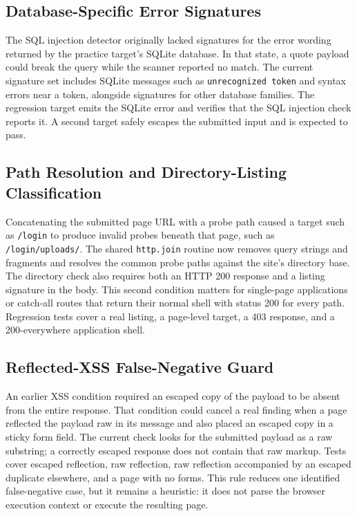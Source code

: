 \documentclass[conference]{IEEEtran}
\begin{document}
\subsection{Database-Specific Error Signatures}
The SQL injection detector originally lacked signatures for the error wording
returned by the practice target's SQLite database. In that state, a quote
payload could break the query while the scanner reported no match. The current
signature set includes SQLite messages such as \texttt{unrecognized token} and
syntax errors near a token, alongside signatures for other database families.
The regression target emits the SQLite error and verifies that the SQL
injection check reports it. A second target safely escapes the submitted input
and is expected to pass.

\subsection{Path Resolution and Directory-Listing Classification}
Concatenating the submitted page URL with a probe path caused a target such as
\texttt{/login} to produce invalid probes beneath that page, such as
\texttt{/login/uploads/}. The shared \texttt{http.join} routine now removes
query strings and fragments and resolves the common probe paths against the
site's directory base. The directory check also requires both an HTTP 200
response and a listing signature in the body. This second condition matters
for single-page applications or catch-all routes that return their normal
shell with status 200 for every path. Regression tests cover a real listing, a
page-level target, a 403 response, and a 200-everywhere application shell.

\subsection{Reflected-XSS False-Negative Guard}
An earlier XSS condition required an escaped copy of the payload to be absent
from the entire response. That condition could cancel a real finding when a
page reflected the payload raw in its message and also placed an escaped copy
in a sticky form field. The current check looks for the submitted payload as a
raw substring; a correctly escaped response does not contain that raw markup.
Tests cover escaped reflection, raw reflection, raw reflection accompanied by
an escaped duplicate elsewhere, and a page with no forms. This rule reduces
one identified false-negative case, but it remains a heuristic: it does not
parse the browser execution context or execute the resulting page.
\end{document}
